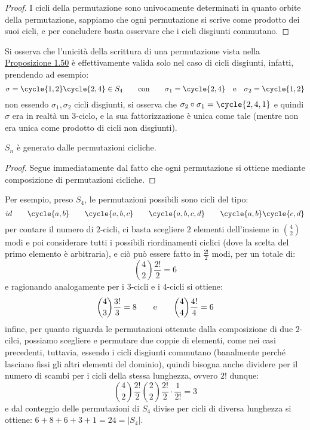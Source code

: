 \documentclass[11pt]{scrartcl}
\begin{document}
\begin{proof}
    I cicli della permutazione sono univocamente determinati in quanto orbite della permutazione, sappiamo che ogni permutazione si scrive come prodotto dei suoi cicli,
    e per concludere basta osservare che i cicli disgiunti commutano.
\end{proof}

\begin{remark}
    Si osserva che l'unicità della scrittura di una permutazione vista nella \hyperref[perm]{Proposizione 1.50} è effettivamente valida solo nel caso di cicli disgiunti, infatti, prendendo ad esempio:
        \[ \sigma = \cycle{1,2}\cycle{2,4} \in S_4 \qquad \text{con}\qquad \sigma_1 = \cycle{2,4} \quad \text e \quad \sigma_2 = \cycle{1,2}
            \]
    non essendo $\sigma_1,\sigma_2$ cicli disgiunti, si osserva che $\sigma_2 \circ \sigma_1 = \cycle{2,4,1}$ e quindi $\sigma$ era in realtà un $3$-ciclo, e la sua fattorizzazione è unica come tale 
    (mentre non era unica come prodotto di cicli non disgiunti). 
\end{remark}

\pagebreak

\begin{corollary}
    $S_n$ è generato dalle permutazioni cicliche.
\end{corollary}

\begin{proof}
    Segue immediatamente dal fatto che ogni permutazione si ottiene mediante composizione di permutazioni cicliche. 
\end{proof}

\begin{example}
    Per esempio, preso $S_4$, le permutazioni possibili sono cicli del tipo:
        \[ id \qquad \cycle{a,b} \qquad \cycle{a,b,c} \qquad \cycle{a,b,c,d} \qquad \cycle{a,b}\cycle{c,d}
            \]
    per contare il numero di $2$-cicli, ci basta scegliere $2$ elementi dell'insieme in $\binom{4}{2}$ modi e poi considerare tutti i possibili 
    riordinamenti ciclici (dove la scelta del primo elemento è arbitraria), e ciò può essere fatto in $\frac{2!}{2}$ modi, per un totale di:
        \[ \binom{4}{2}\frac{2!}{2} = 6
            \]
    e ragionando analogamente per i $3$-cicli e i $4$-cicli si ottiene:
        \[ \binom{4}{3}\frac{3!}{3} = 8 \qquad \text e \qquad \binom{4}{4}\frac{4!}{4} = 6
            \]
    infine, per quanto riguarda le permutazioni ottenute dalla composizione di due $2$-cilci, possiamo scegliere e permutare due coppie di elementi, come 
    nei casi precedenti, tuttavia, essendo i cicli disgiunti commutano (banalmente perché lasciano fissi gli altri elementi del dominio), quindi bisogna anche 
    dividere per il numero di scambi per i cicli della stessa lunghezza, ovvero $2!$ dunque:
        \[ \binom{4}{2}\frac{2!}{2}\binom{2}{2}\frac{2!}{2} \cdot \frac{1}{2!} = 3
            \]
    e dal conteggio delle permutazioni di $S_4$ divise per cicli di diversa lunghezza si ottiene: $6+8+6+3+1 = 24 = |S_4|$.
\end{example}
\end{document}
